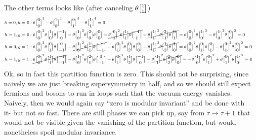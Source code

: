 \documentclass[11pt, class=article, crop=false]{standalone}
\begin{document}
\begin{enumerate}
	The other terms looks like (after canceling $\theta \twist11$)
	\[
	\footnotesize
	\begin{aligned}
		h=0, h=0:\;& \theta\twist00^4 - \theta\twist10^4 - \theta\twist01^4 - \theta\twist11^4 = 0\\
		h=1, g=0:\;& \theta \twist00^2 \theta\twist10 \theta \twist{-1}{0} - \theta \twist10^2 \theta \twist20 \theta \twist00 - \cancel{\theta \twist01^2 \theta \twist11 \theta \twist{-1}1} - \cancel{\theta \twist11^2 \theta \twist21 \theta \twist01} = \theta \twist00^2 \theta\twist10^2 - \theta \twist10^2 \theta \twist00^2 = 0 \\
		h=0, g=1:\;& \theta \twist00^2 \theta\twist01 \theta \twist0{-1} - \cancel{\theta \twist10^2 \theta \twist11 \theta \twist1{-1}} - \theta \twist01^2 \theta\twist02 \theta \twist00 - \cancel{\theta\twist11^2 \theta\twist12 \theta\twist10} = \theta \twist00^2 \theta\twist01 \theta \twist01 -   \theta \twist01^2 \theta \twist00^2  = 0 \\
		h=1, g=1:\;& \cancel{\theta \twist00^2 \theta\twist11 \theta \twist{-1}{-1}} - \theta \twist10^2 \theta \twist21 \theta \twist0{-1} - \theta \twist01^2 \theta \twist12 \theta \twist{-1}0 - \cancel{\theta \twist11^2 \theta\twist22 \theta\twist00} = - \theta\twist10^2 \theta\twist01^2 + \theta\twist01^2 \theta\twist10^2 = 0
	\end{aligned}
	\]
	Ok, so in fact this partition function is zero. This should not be surprising, since naively we are just breaking supersymmetry in half, and so we should still expect fermions and bosons to run in loops such that the vacuum energy vanishes. Naively, then we would again say ``zero is modular invariant'' and be done with it- but not so fast. There are still phases we can pick up, say from  $\tau \to \tau + 1$ that would not be visible given the vanishing of the partition function, but would nonetheless spoil modular invariance. 
	

\end{enumerate}
\end{document}

